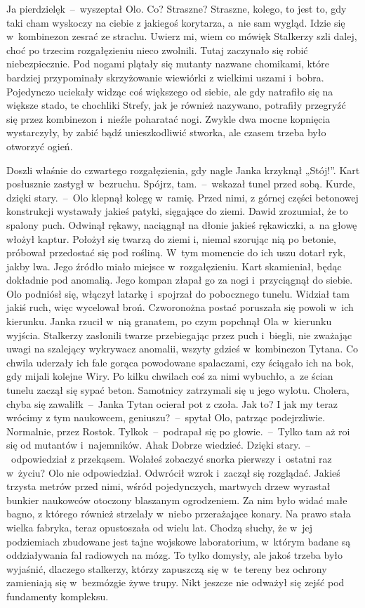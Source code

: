 \documentclass[../MAIN.tex]{subfiles}
\begin{document}
\xx Ja pierdzielę\3k~--~wyszeptał Olo.
\xx Co? Straszne? Straszne, kolego, to jest to, gdy taki cham wyskoczy na ciebie z jakiegoś korytarza, a~nie sam wygląd. Idzie się w~kombinezon zesrać ze strachu. Uwierz mi, wiem co mówię\3k
\qm
Stalkerzy szli dalej, choć po trzecim rozgałęzieniu nieco zwolnili. Tutaj zaczynało się robić niebezpiecznie. Pod nogami plątały się mutanty nazwane chomikami, które bardziej przypominały skrzyżowanie wiewiórki z wielkimi uszami i~bobra. Pojedynczo uciekały widząc coś większego od siebie, ale gdy natrafiło się na większe stado, te chochliki Strefy, jak je również nazywano, potrafiły przegryźć się przez kombinezon i~nieźle poharatać nogi. Zwykle dwa mocne kopnięcia wystarczyły, by zabić bądź unieszkodliwić stworka, ale czasem trzeba było otworzyć ogień.

Doszli właśnie do czwartego rozgałęzienia, gdy nagle Janka krzyknął „Stój!”. Kart posłusznie zastygł w~bezruchu.
\sx Spójrz, tam.~--~wskazał tunel przed sobą.
\xx Kurde, dzięki stary.~--~Olo klepnął kolegę w~ramię.
\qm
Przed nimi, z górnej części betonowej konstrukcji wystawały jakieś patyki, sięgające do ziemi. Dawid zrozumiał, że to spalony puch. Odwinął rękawy, naciągnął na dłonie jakieś rękawiczki, a~na głowę włożył kaptur. Położył się twarzą do ziemi i, niemal szorując nią po betonie, próbował przedostać się pod rośliną. W~tym momencie do ich uszu dotarł ryk, jakby lwa. Jego źródło miało miejsce w~rozgałęzieniu. Kart skamieniał, będąc dokładnie pod anomalią. Jego kompan złapał go za nogi i~przyciągnął do siebie. Olo podniósł się, włączył latarkę i~spojrzał do pobocznego tunelu. Widział tam jakiś ruch, więc wycelował broń. Czworonożna postać poruszała się powoli w~ich kierunku. Janka rzucił w~nią granatem, po czym popchnął Ola w~kierunku wyjścia. Stalkerzy zasłonili twarze przebiegając przez puch i~biegli, nie zważając uwagi na szalejący wykrywacz anomalii, wszyty gdzieś w~kombinezon Tytana. Co chwila uderzały ich fale gorąca powodowane spalaczami, czy ściągało ich na bok, gdy mijali kolejne Wiry. Po
kilku chwilach coś
za nimi wybuchło, a~ze ścian tunelu zaczął się sypać beton. Samotnicy zatrzymali się u jego wylotu.
\sx Cholera, chyba się zawalił\3k~--~Janka Tytan ocierał pot z czoła.
\xx Jak to? I jak my teraz wrócimy z tym naukowcem, geniuszu?~--~spytał Olo, patrząc podejrzliwie.
\xx Normalnie, przez Rostok. Tylko\3k~--~podrapał się po głowie.~--~Tylko tam aż roi się od mutantów i~najemników.
\xx Aha\3k Dobrze wiedzieć. Dzięki stary.~--~odpowiedział z przekąsem.
\xx Wolałeś zobaczyć snorka pierwszy i~ostatni raz w~życiu?
\qm
Olo nie odpowiedział. Odwrócił wzrok i~zaczął się rozglądać. Jakieś trzysta metrów przed nimi, wśród pojedynczych, martwych drzew wyrastał bunkier naukowców otoczony blaszanym ogrodzeniem. Za nim było widać małe bagno, z którego również strzelały w~niebo przerażające konary. Na prawo stała wielka fabryka, teraz opustoszała od wielu lat. Chodzą słuchy, że w~jej podziemiach zbudowane jest tajne wojskowe laboratorium, w~którym badane są oddziaływania fal radiowych na mózg. To tylko domysły, ale jakoś trzeba było wyjaśnić, dlaczego stalkerzy, którzy zapuszczą się w~te tereny bez ochrony zamieniają się w~bezmózgie żywe trupy. Nikt jeszcze nie odważył się zejść pod fundamenty kompleksu.
\end{document}
